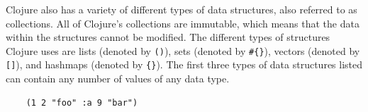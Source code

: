 \documentclass[12pt]{article}
\newcommand{\comment}[1]{{\bf \tt  {#1}}}
\newcommand{\emcomment}[1]{\textcolor{ForestGreen}{\comment{Elena: {#1}}}}
\newcommand{\mmcomment}[1]{\textcolor{magenta}{\comment{Max: {#1}}}}
\begin{document}


Clojure also has a variety of different types of data structures, also referred to as collections. All 
of Clojure's collections are immutable, which means that the data within the structures cannot be
modified. 
The different types of structures Clojure uses are lists (denoted by \texttt{()}), sets (denoted by
\texttt{\#\{\}}), vectors (denoted by \texttt{[]}), and hashmaps (denoted by \texttt{\{\}}). The first
three types of data structures listed can contain any number of values of any data type.
\begin{verbatim}
	(1 2 "foo" :a 9 "bar")
\end{verbatim}


\end{document}
